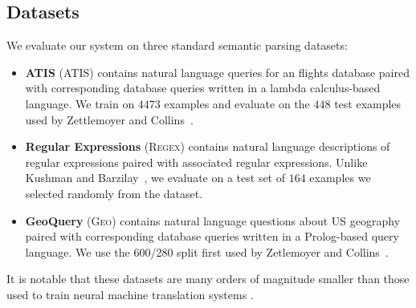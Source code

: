 \documentclass[11pt,letterpaper]{article}
\newcommand{\atis}{\textsc{ATIS}\xspace}
\newcommand{\regex}{\textsc{Regex}\xspace}
\newcommand{\geo}{\textsc{Geo}\xspace}
\begin{document}
\subsection{Datasets}

We evaluate our system on three standard semantic parsing datasets:
\begin{itemize}
  \item \textbf{ATIS} (\atis) contains 
    natural language queries for an flights database
    paired with corresponding database queries written in a 
    lambda calculus-based language.  
    We train on $4473$ examples and evaluate on the $448$
    test examples used by Zettlemoyer and 
    Collins~.

  \item \textbf{Regular Expressions} (\regex)
  contains natural language descriptions of regular expressions
  paired with associated regular expressions.
  Unlike Kushman and Barzilay~, 
  we evaluate
  on a test set of $164$ examples we selected randomly
  from the dataset.

  \item \textbf{GeoQuery} (\geo) contains
  natural language questions about US geography
  paired with corresponding database queries written in a Prolog-based
  query language.
  We use the 600/280 split first used by
  Zetlemoyer and Collins~.
\end{itemize}

It is notable that these datasets are many orders of magnitude smaller
than those used to train neural machine translation systems
\cite{sutskever2014sequence,bahdanau2014neural}.
\end{document}
